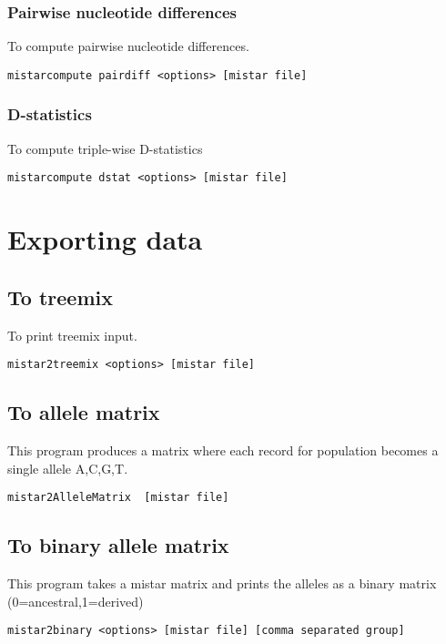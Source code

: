 \documentclass[a4paper]{article}
\begin{document}
\subsubsection{Pairwise nucleotide differences}

To compute pairwise nucleotide differences.
\begin{verbatim}
mistarcompute pairdiff <options> [mistar file]
\end{verbatim}

\subsubsection{D-statistics}
To compute triple-wise D-statistics
\begin{verbatim}
mistarcompute dstat <options> [mistar file]
\end{verbatim}


\section{Exporting data}
\subsection{To treemix}

To print treemix input.
\begin{verbatim}
mistar2treemix <options> [mistar file]
\end{verbatim}

\subsection{To allele matrix}

This program produces a matrix where each record for population becomes a single allele {A,C,G,T}.
\begin{verbatim}
mistar2AlleleMatrix  [mistar file]
\end{verbatim}


\subsection{To binary allele matrix}

This program takes a mistar matrix and prints the alleles as a binary matrix (0=ancestral,1=derived)

\begin{verbatim}
mistar2binary <options> [mistar file] [comma separated group]
\end{verbatim}
\end{document}

